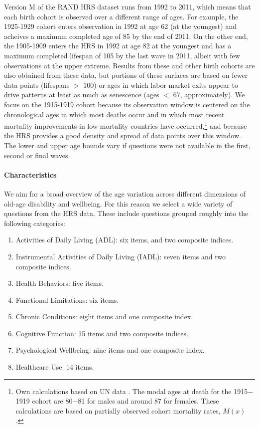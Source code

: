 \documentclass[11pt,oneside]{article} %
\begin{document}
Version M of the RAND HRS dataset runs from 1992 to 2011, which
means that each birth cohort is observed over a different range of ages. For
example, the 1925-1929 cohort enters observation in 1992 at age 62 (at the
youngest) and acheives a maximum completed age of 85 by the end of 2011. On the
other end, the 1905-1909 enters the HRS in 1992 at age 82 at the youngest and
has a maximum completed lifespan of 105 by the last wave in 2011, albeit with
few observations at the upper extreme. Results from these and other birth
cohorts are also obtained from these data, but portions of these surfaces are
based on fewer data points (lifespans $>$ 100) or ages in which labor market
exits appear to drive patterns at least as much as senescence (ages $<$ 67,
approximately). We focus on the 1915-1919 cohort because its observation window
is centered on the chronological ages in which most deaths occur and in which most recent mortality improvements in low-mortality countries have occurred,\footnote{Own calculations based on UN
data \citep{UN2012prospects}. The modal ages at death for the 1915$-$1919 cohort
are 80$-$81 for males and around 87 for females. These calculations are based on
partially observed cohort mortality rates, $M(x)$ \citep{HMD}.} and because
the HRS provides a good density and spread of data points over this window. The lower and upper age bounds vary if questions were not available in the first, second or final waves.

\paragraph*{Characteristics}
We aim for a broad overview of the age variation across different dimensions of
old-age disability and wellbeing. For this reason we select a wide variety of
questions from the HRS data. These include questions
grouped roughly into the following categories: 

\begin{enumerate}
  \item Activities of Daily Living (ADL): six items, and two composite indices.
  \item Instrumental Activities of Daily Living (IADL): seven items and two
  composite indices.
  \item Health Behaviors: five items.
  \item Functional Limitations: six items.
  \item Chronic Conditions: eight items and one composite index.
  \item Cognitive Function: 15 items and two composite indices.
  \item Psychological Wellbeing: nine items and one composite index.
  \item Healthcare Use: 14 items.
\end{enumerate}
\end{document}
